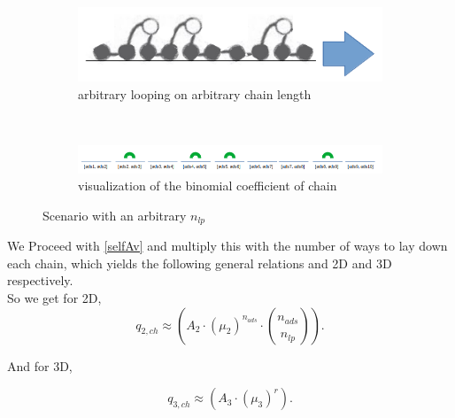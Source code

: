 \documentclass[10pt,letterpaper]{article}
\begin{document}
\begin{figure}[h!]
	\centering
	\begin{subfigure}[b]{0.2\textwidth}
		\centering
		\includegraphics[scale=0.2]{multiloops.png}
		\caption{arbitrary looping on arbitrary chain length}
		\label{loop and train}
	\end{subfigure}~~
	\begin{subfigure}[b]{0.6\textwidth}
		\centering
		\includegraphics[scale=0.6]{looping.png}
		\caption{visualization of the binomial coefficient of chain}
		\label{loop and train}		
	\end{subfigure}
\caption{Scenario with an arbitrary $n_{lp}$}
\end{figure}



\noindent We Proceed with \ref{selfAv} and multiply this with the number of ways to lay down each chain, which yields the following general relations and 2D and 3D respectively.\\ 

\noindent So we get for 2D,
\begin{equation}
	q_{2,ch}\approx \left(A_2\cdot (\mu_{2})^{n_{ads}} \cdot \binom{n_{ads}}{n_{lp}} \right). 
	\label{eq. q2}
\end{equation}

\noindent And for 3D, 

\begin{equation}
	q_{3,ch}\approx \left(A_3\cdot (\mu_{3})^{r}\right).
	\label{eq. q3}
\end{equation}



%
\end{document}
